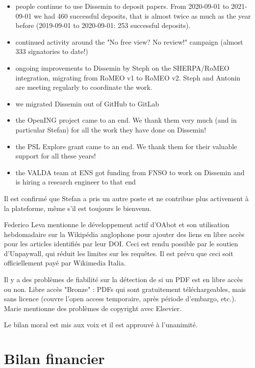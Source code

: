 \documentclass[a4paper]{article}
\begin{document}
\begin{itemize}
  \item people continue to use Dissemin to deposit papers. From 2020-09-01 to 2021-09-01 we had 460 successful deposits, that is almost twice as much as the year before (2019-09-01 to 2020-09-01: 253 successful deposits).
  \item continued activity around the "No free view? No review!" campaign (almost 333 signatories to date!)
  \item ongoing improvements to Dissemin by Steph on the SHERPA/RoMEO integration, migrating from RoMEO v1 to RoMEO v2. Steph and Antonin are meeting regularly to coordinate the work.
  \item we migrated Dissemin out of GitHub to GitLab
  \item the OpenING project came to an end. We thank them very much (and in particular Stefan) for all the work they have done on Dissemin!
  \item the PSL Explore grant came to an end. We thank them for their valuable support for all these years!
  \item the VALDA team at ENS got funding from FNSO to work on Dissemin and is hiring a research engineer to that end
\end{itemize}

Il est confirmé que Stefan a pris un autre poste et ne contribue plus activement à la plateforme, même s'il est toujours le bienvenu.

Federico Leva mentionne le développement actif d'OAbot et son utilisation hebdomadaire sur la Wikipédia anglophone pour ajouter des liens en libre accès pour les articles identifiés par leur DOI. Ceci est rendu possible par le soutien d'Unpaywall, qui réduit les limites sur les requêtes. Il est prévu que ceci soit officiellement payé par Wikimedia Italia.

Il y a des problèmes de fiabilité sur la détection de si un PDF est en libre accès ou non. Libre accès "Bronze" : PDFs qui sont gratuitement téléchargeables, mais sans licence (couvre l'open access temporaire, après période d'embargo, etc.). Marie mentionne des problèmes de copyright avec Elsevier.

Le bilan moral est mis aux voix et il est approuvé à l'unanimité.

\section{Bilan financier}
\end{document}
